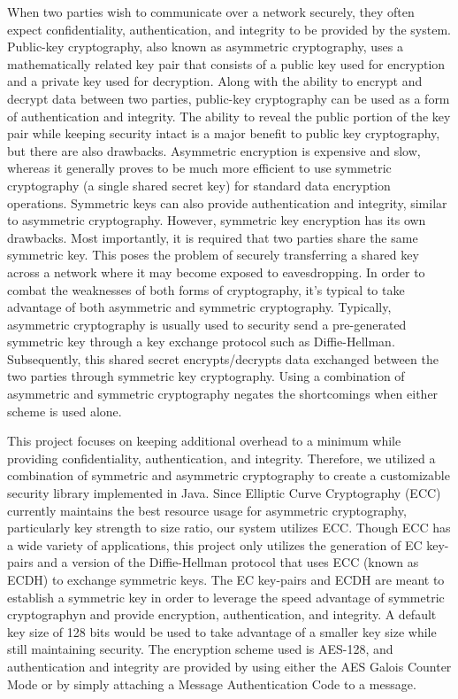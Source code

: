 When two parties wish to communicate over a network securely, they often expect confidentiality, authentication, and integrity to be provided by the system. Public-key cryptography, also known as asymmetric cryptography, uses a mathematically related key pair that consists of a public key used for encryption and a private key used for decryption. Along with the ability to encrypt and decrypt data between two parties, public-key cryptography can be used as a form of authentication and integrity. The ability to reveal the public portion of the key pair while keeping security intact is a major benefit to public key cryptography, but there are also drawbacks. Asymmetric encryption is expensive and slow, whereas it generally proves to be much more efficient to use symmetric cryptography (a single shared secret key) for standard data encryption operations. Symmetric keys can also provide authentication and integrity, similar to asymmetric cryptography. However, symmetric key encryption has its own drawbacks. Most importantly, it is required that two parties share the same symmetric key. This poses the problem of securely transferring a shared key across a network where it may become exposed to eavesdropping. In order to combat the weaknesses of both forms of cryptography, it's typical to take advantage of both asymmetric and symmetric cryptography. Typically, asymmetric cryptography is usually used to security send a pre-generated symmetric key through a key exchange protocol such as Diffie-Hellman. Subsequently, this shared secret encrypts/decrypts data exchanged between the two parties through symmetric key cryptography. Using a combination of asymmetric and symmetric cryptography negates the shortcomings when either scheme is used alone.

This project focuses on keeping additional overhead to a minimum while providing confidentiality, authentication, and integrity. Therefore, we utilized a combination of symmetric and asymmetric cryptography to create a customizable security library implemented in Java. Since Elliptic Curve Cryptography (ECC) currently maintains the best resource usage for asymmetric cryptography, particularly key strength to size ratio, our system utilizes ECC. Though ECC has a wide variety of applications, this project only utilizes the generation of EC key-pairs and a version of the Diffie-Hellman protocol that uses ECC (known as ECDH) to exchange symmetric keys. The EC key-pairs and ECDH are meant to establish a symmetric key in order to leverage the speed advantage of symmetric cryptographyn and provide encryption, authentication, and integrity. A default key size of 128 bits would be used to take advantage of a smaller key size while still maintaining security. The encryption scheme used  is AES-128, and  authentication and integrity are provided by using either the AES Galois Counter Mode or by simply attaching a Message Authentication Code to a message.  

